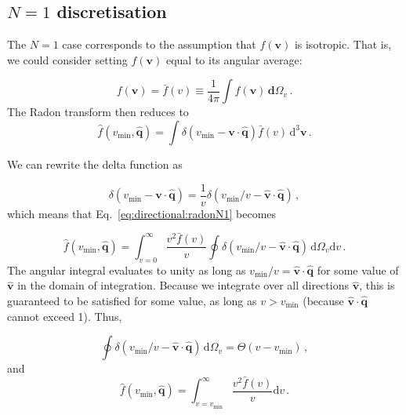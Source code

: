 
\subsection{$N=1$ discretisation}

The $N=1$ case corresponds to the assumption that $f(\textbf{v})$ is isotropic. That is, we could consider setting $f(\textbf{v})$ equal to its angular average:

\begin{equation}
\label{eq:directional:isotropic}
f(\textbf{v}) = \bar{f}(v) \equiv \frac{1}{4\pi} \int f(\textbf{v}) \, \mathbf{d}\Omega_v\,.
\end{equation}
The Radon transform then reduces to
\begin{equation}
\label{eq:directional:radonN1}
\hat{f}\left(v_\textrm{min},\hat{\textbf{q}}\right) = \int \delta\left(v_\textrm{min} - \textbf{v}\cdot\hat{\textbf{q}}\right) \bar{f}(v) \,\textrm{d}^3\textbf{v}\,.
\end{equation}

We can rewrite the delta function as

\begin{equation}
\delta\left(v_\textrm{min} - \textbf{v}\cdot\hat{\textbf{q}}\right) = \frac{1}{v}\delta(v_\textrm{min}/v - \hat{\textbf{v}}\cdot\hat{\textbf{q}})\,,
\end{equation}
which means that Eq.~\ref{eq:directional:radonN1} becomes

\begin{equation}
\hat{f}\left(v_\textrm{min},\hat{\textbf{q}}\right) = \int_{v=0}^\infty \frac{v^2\bar{f}(v)}{v} \oint \delta\left(v_\textrm{min}/v - \hat{\textbf{v}}\cdot\hat{\textbf{q}}\right)  \, \mathrm{d}\Omega_v\mathrm{d}v\,.
\end{equation}
The angular integral evaluates to unity as long as $v_\textrm{min}/v = \hat{\textbf{v}}\cdot\hat{\textbf{q}}$ for some value of $\hat{\textbf{v}}$ in the domain of integration. Because we integrate over all directions $\hat{\textbf{v}}$, this is guaranteed to be satisfied for some value, as long as $v > v_\textrm{min}$ (because $\hat{\textbf{v}}\cdot\hat{\textbf{q}}$ cannot exceed 1). Thus,

\begin{equation}
\oint \delta\left(v_\textrm{min}/v - \hat{\textbf{v}}\cdot\hat{\textbf{q}}\right)  \, \mathrm{d}\Omega_v = \Theta(v - v_\textrm{min})\,,
\end{equation}
and
\begin{equation}
\hat{f}\left(v_\textrm{min},\hat{\textbf{q}}\right) = \int_{v=v_\textrm{min}}^\infty \frac{v^2\bar{f}(v)}{v} \mathrm{d}v\,.
\end{equation}

